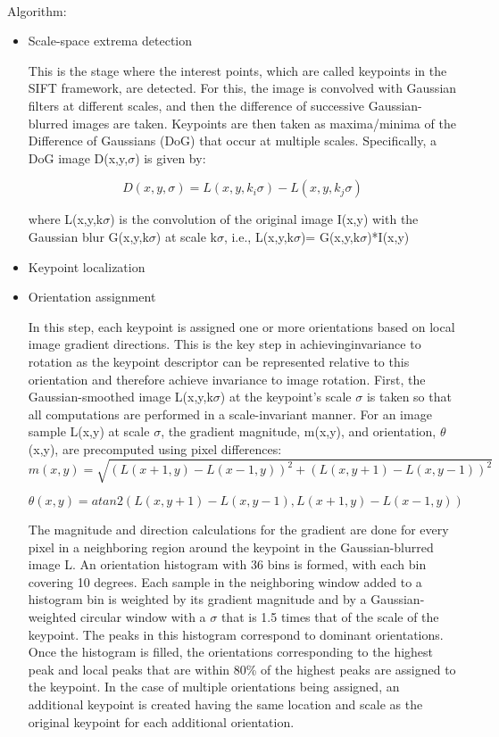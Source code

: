 \documentclass[12pt]{article}
\begin{document}
\paragraph{}
Algorithm:
\begin{itemize}
	\item Scale-space extrema detection
	
	
This is the stage where the interest points, which are called keypoints in the SIFT framework, are detected. For this, the image is convolved with Gaussian filters at different scales, and then the difference of successive Gaussian-blurred images are taken. Keypoints are then taken as maxima/minima of the Difference of Gaussians (DoG) that occur at multiple scales. Specifically, a DoG image D(x,y,$\sigma$) is given by:
 
\begin{equation}
D(x,y,\sigma)=L(x,y,k_i\sigma)-L(x,y,k_j\sigma)
\end{equation}

where L(x,y,k$\sigma$) is the convolution of the original image I(x,y) with the Gaussian blur G(x,y,k$\sigma$) at scale k$\sigma$, i.e., L(x,y,k$\sigma$)= G(x,y,k$\sigma$)*I(x,y)
	\item Keypoint localization
	\item Orientation assignment
	
	In this step, each keypoint is assigned one or more orientations based on local image gradient directions. This is the key step in achievinginvariance to rotation as the keypoint descriptor can be represented relative to this orientation and therefore achieve invariance to image rotation.
First, the Gaussian-smoothed image L(x,y,k$\sigma$) at the keypoint's scale $\sigma$ is taken so that all computations are performed in a scale-invariant manner. For an image sample L(x,y) at scale $\sigma$, the gradient magnitude, m(x,y), and orientation, $\theta$(x,y), are precomputed using pixel differences:
\begin{equation}
m(x,y)=\sqrt{(L(x+1,y)-L(x-1,y))^2+(L(x,y+1)-L(x,y-1))^2}
\end{equation}

\begin{equation}
\theta(x,y)=atan2(L(x,y+1)-L(x,y-1),L(x+1,y)-L(x-1,y))
\end{equation}

The magnitude and direction calculations for the gradient are done for every pixel in a neighboring region around the keypoint in the Gaussian-blurred image L. An orientation histogram with 36 bins is formed, with each bin covering 10 degrees. Each sample in the neighboring window added to a histogram bin is weighted by its gradient magnitude and by a Gaussian-weighted circular window with a $\sigma$ that is 1.5 times that of the scale of the keypoint. The peaks in this histogram correspond to dominant orientations. Once the histogram is filled, the orientations corresponding to the highest peak and local peaks that are within 80\% of the highest peaks are assigned to the keypoint. In the case of multiple orientations being assigned, an additional keypoint is created having the same location and scale as the original keypoint for each additional orientation.


\end{itemize}
\end{document}
